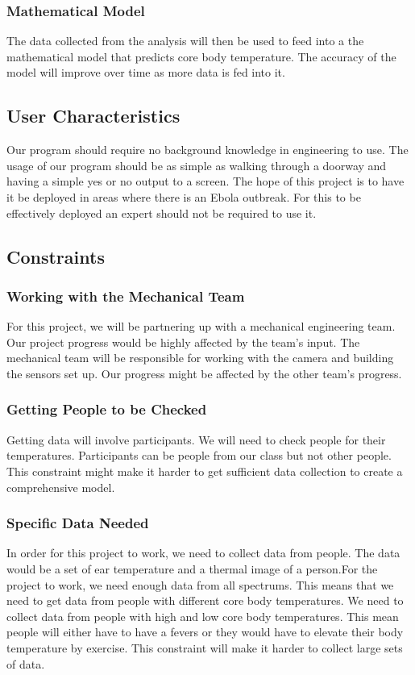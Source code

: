 \documentclass[10pt, draftclsnofoot, onecolumn]{IEEEtran}
\begin{document}
		\subsubsection{Mathematical Model}
		The data collected from the analysis will then be used to feed into a the mathematical model that predicts core body temperature. The accuracy of the model will improve over time as more data is fed into it.
	\subsection{User Characteristics}
	Our program should require no background knowledge in engineering to use. The usage of our program should be as simple as walking through a doorway and having a simple yes or no output to a screen. The hope of this project is to have it be deployed in areas where there is an Ebola outbreak. For this to be effectively deployed an expert should not be required to use it.
	\subsection{Constraints}
		\subsubsection{Working with the Mechanical Team}
		For this project, we will be partnering up with a mechanical engineering team. Our project progress would be highly affected by the team’s input. The mechanical team will be responsible for working with the camera and building the sensors set up. Our progress might be affected by the other team’s progress.
		\subsubsection{Getting People to be Checked}
		Getting data will involve participants. We will need to check people for their temperatures. Participants can be people from our class but not other people. This constraint might make it harder to get sufficient data collection to create a comprehensive model.
		\subsubsection{Specific Data Needed}
		In order for this project to work, we need to collect data from people. The data would be a set of ear temperature and a thermal image of a person.For the project to work, we need enough data from all spectrums. This means that we need to get data from people with different core body temperatures. We need to collect data from people with high and low core body temperatures. This mean people will either have to have a fevers or they would have to elevate their body temperature by exercise. This constraint will make it harder to collect large sets of data.
\end{document}
